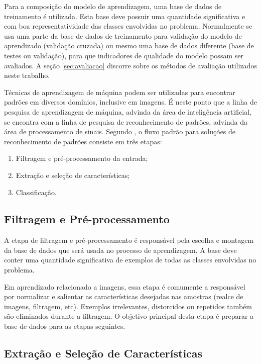 Para a composição do modelo de aprendizagem, uma base de dados de treinamento é utilizada. Esta base deve possuir uma quantidade significativa e com boa representatividade das classes envolvidas no problema. Normalmente se usa uma parte da base de dados de treinamento para validação do modelo de aprendizado (validação cruzada) ou mesmo uma base de dados diferente (base de testes ou validação), para que indicadores de qualidade do modelo possam ser avaliados. A seção \ref{sec:avaliacao} discorre sobre os métodos de avaliação utilizados neste trabalho.

Técnicas de aprendizagem de máquina podem ser utilizadas para encontrar padrões em diversos domínios, inclusive em imagens. É neste ponto que a linha de pesquisa de aprendizagem de máquina, advinda da área de inteligência artificial, se encontra com a linha de pesquisa de reconhecimento de padrões, advinda da área de processamento de sinais. Segundo , o fluxo padrão para soluções de reconhecimento de padrões consiste em três etapas:

\begin{enumerate}
    \item Filtragem e pré-processamento da entrada;
    \item Extração e seleção de características;
    \item Classificação.
\end{enumerate}


\subsection{Filtragem e Pré-processamento}

A etapa de filtragem e pré-processamento é responsável pela escolha e montagem da base de dados que será usada no processo de aprendizagem. A base deve conter uma quantidade significativa de exemplos de todas as classes envolvidas no problema.

Em aprendizado relacionado a imagens, essa etapa é comumente a responsável por normalizar e salientar as características desejadas nas amostras (realce de imagens, filtragem, etc). Exemplos irrelevantes, distorcidos ou repetidos também são eliminados durante a filtragem. O objetivo principal desta etapa é preparar a base de dados para as etapas seguintes.


\subsection{Extração e Seleção de Características}

